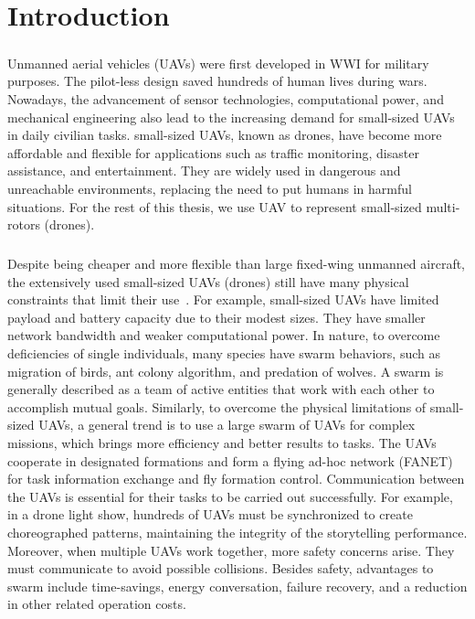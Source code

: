 \documentclass[a4paper,12pt]{report}
\begin{document}
\tableofcontents 
\newpage
{}
\listoffigures \newpage
\setcounter{page}{1}

\chapter{Introduction}

\paragraph{}
Unmanned aerial vehicles (UAVs) were first developed in WWI for military purposes\cite{4161584}. The pilot-less design saved hundreds of human lives during wars. Nowadays, the advancement of sensor technologies, computational power, and mechanical engineering also lead to the increasing demand for small-sized UAVs in daily civilian tasks. small-sized UAVs, known as drones, have become more affordable and flexible for applications such as traffic monitoring, disaster assistance, and entertainment\cite{1,2,3}. They are widely used in dangerous and unreachable environments, replacing the need to put humans in harmful situations. For the rest of this thesis,  we use UAV to represent small-sized multi-rotors (drones).

\paragraph{}
Despite being cheaper and more flexible than large fixed-wing unmanned aircraft, the extensively used small-sized UAVs (drones) still have many physical constraints that limit their use~\cite{4}. For example, small-sized UAVs have limited payload and battery capacity due to their modest sizes. They have smaller network bandwidth and weaker computational power. In nature, to overcome deficiencies of single individuals, many species have swarm behaviors, such as migration of birds, ant colony algorithm, and predation of wolves\cite{swarm,doi:10.1139/juvs-2018-0009}. A swarm is generally described as a team of active entities that work with each other to accomplish mutual goals\cite{doi:10.1139/juvs-2018-0009}. Similarly, to overcome the physical limitations of small-sized UAVs, a general trend is to use a large swarm of UAVs for complex missions, which brings more efficiency and better results to tasks. The UAVs cooperate in designated formations and form a flying ad-hoc network (FANET) for task information exchange and fly formation control\cite{4,5,6}.  Communication between the UAVs is essential for their tasks to be carried out successfully. For example, in a drone light show, hundreds of UAVs must be synchronized to create choreographed patterns, maintaining the integrity of the storytelling performance. Moreover, when multiple UAVs work together, more safety concerns arise. They must communicate to avoid possible collisions. Besides safety, advantages to swarm include time-savings, energy conversation, failure recovery, and a reduction in other related operation costs\cite{doi:10.1139/juvs-2018-0009}.
\end{document}
